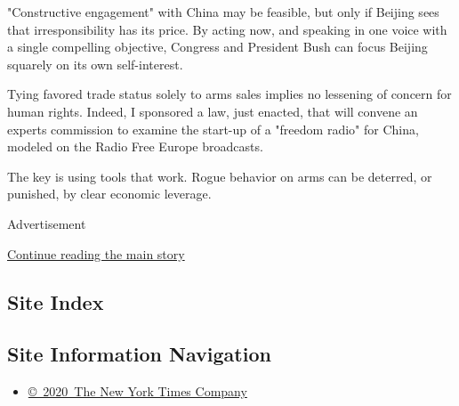 "Constructive engagement" with China may be feasible, but only if
Beijing sees that irresponsibility has its price. By acting now, and
speaking in one voice with a single compelling objective, Congress and
President Bush can focus Beijing squarely on its own self-interest.

Tying favored trade status solely to arms sales implies no lessening of
concern for human rights. Indeed, I sponsored a law, just enacted, that
will convene an experts commission to examine the start-up of a "freedom
radio" for China, modeled on the Radio Free Europe broadcasts.

The key is using tools that work. Rogue behavior on arms can be
deterred, or punished, by clear economic leverage.

Advertisement

\protect\hyperlink{after-bottom}{Continue reading the main story}

\hypertarget{site-index}{%
\subsection{Site Index}\label{site-index}}

\hypertarget{site-information-navigation}{%
\subsection{Site Information
Navigation}\label{site-information-navigation}}

\begin{itemize}
\tightlist
\item
  \href{https://help.nytimes3xbfgragh.onion/hc/en-us/articles/115014792127-Copyright-notice}{©~2020~The
  New York Times Company}
\end{itemize}


